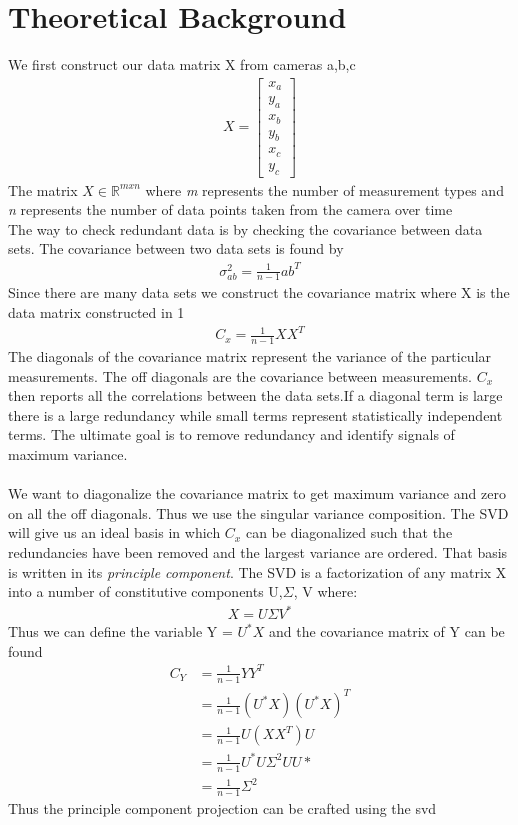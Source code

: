 \documentclass[]{article}
\begin{document}
\section{Theoretical Background }
We first construct our data matrix X from cameras a,b,c
	\begin{align}
	X = \begin{bmatrix}
		x_a\\y_a\\x_b\\y_b\\x_c\\y_c
	\end{bmatrix}
\end{align}
The matrix $X\in \mathbb{R}^{mxn}$ where \textit{m} represents the number of measurement types and \textit{n} represents the number of data points taken from the camera over time\\
The way to check redundant data is by checking the covariance between data sets. The covariance between two data sets is found by 
\begin{align}
\sigma_{ab}^2 = \frac{1}{n-1}ab^T
\end{align} 
Since there are many data sets we construct the covariance matrix where X is the data matrix constructed in 1
\begin{align}
C_x = \frac{1}{n-1}XX^T
\end{align}
The diagonals of the covariance matrix represent the variance of the particular measurements. The off diagonals are the covariance between measurements. $C_x$ then reports all the correlations between the data sets.If a diagonal term is large there is a large redundancy while small terms represent statistically independent terms. The ultimate goal is to remove redundancy and identify signals of maximum variance. \\\\
We want to diagonalize the covariance matrix to get maximum variance and zero on all the off diagonals. Thus we use the singular variance composition. The SVD will give us an ideal basis in which $C_x$ can be diagonalized such that the redundancies have been removed and the largest variance are ordered. That basis is written in its \textit{principle component}. The SVD is a factorization of any matrix X into a number of constitutive components U,$\Sigma$, V where:
\begin{align}
X = U\Sigma V^*
\end{align}
Thus we can define the variable Y = $U^*X$ and the covariance matrix of Y can be found 
\begin{equation}
\begin{aligned}
C_Y &= \frac{1}{n-1}YY^T\\
&=\frac{1}{n-1}(U^*X)(U^*X)^T\\
&=\frac{1}{n-1}U(XX^T)U\\
&=\frac{1}{n-1}U^*U\Sigma^2UU*\\
&=\frac{1}{n-1}\Sigma^2
\end{aligned}
\end{equation}
Thus the principle component projection can be crafted using the svd 
\end{document}
